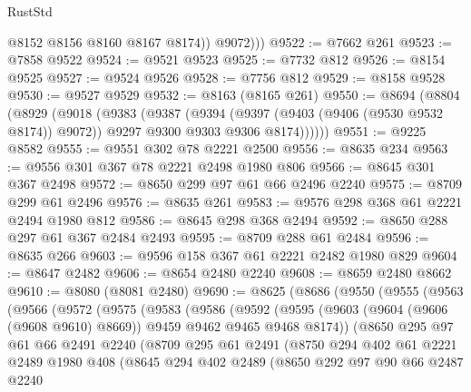 \begin{lexlean}{RustStd}
\begin{coremodule}
              @8152
              @8156
              @8160
              @8167
              @8174))
          @9072)))
@9522 := @7662 @261
@9523 := @7858 @9522
@9524 := @9521 @9523
@9525 := @7732 @812
@9526 := @8154 @9525
@9527 := @9524 @9526
@9528 := @7756 @812
@9529 := @8158 @9528
@9530 := @9527 @9529
@9532 := @8163 (@8165 @261)
@9550 := @8694
    (@8804
      (@8929
        (@9018
          (@9383
            (@9387
              (@9394
                (@9397 (@9403 (@9406 (@9530 @9532 @8174)) @9072))
                @9297
                @9300
                @9303
                @9306
                @8174))))))
@9551 := @9225 @8582
@9555 := @9551 @302 @78 @2221 @2500
@9556 := @8635 @234
@9563 := @9556 @301 @367 @78 @2221 @2498 @1980 @806
@9566 := @8645 @301 @367 @2498
@9572 := @8650 @299 @97 @61 @66 @2496 @2240
@9575 := @8709 @299 @61 @2496
@9576 := @8635 @261
@9583 := @9576 @298 @368 @61 @2221 @2494 @1980 @812
@9586 := @8645 @298 @368 @2494
@9592 := @8650 @288 @297 @61 @367 @2484 @2493
@9595 := @8709 @288 @61 @2484
@9596 := @8635 @266
@9603 := @9596 @158 @367 @61 @2221 @2482 @1980 @829
@9604 := @8647 @2482
@9606 := @8654 @2480 @2240
@9608 := @8659 @2480 @8662
@9610 := @8080 (@8081 @2480)
@9690 := @8625
    (@8686
      (@9550
        (@9555
          (@9563
            (@9566
              (@9572
                (@9575
                  (@9583
                    (@9586
                      (@9592
                        (@9595
                          (@9603 (@9604 (@9606 (@9608 @9610) @8669)) @9459 @9462 @9465 @9468 @8174))
                        (@8650
                          @295
                          @97
                          @61
                          @66
                          @2491
                          @2240
                          (@8709
                            @295
                            @61
                            @2491
                            (@8750
                              @294
                              @402
                              @61
                              @2221
                              @2489
                              @1980
                              @408
                              (@8645
                                @294
                                @402
                                @2489
                                (@8650
                                  @292
                                  @97
                                  @90
                                  @66
                                  @2487
                                  @2240

\end{coremodule}
\end{lexlean}
